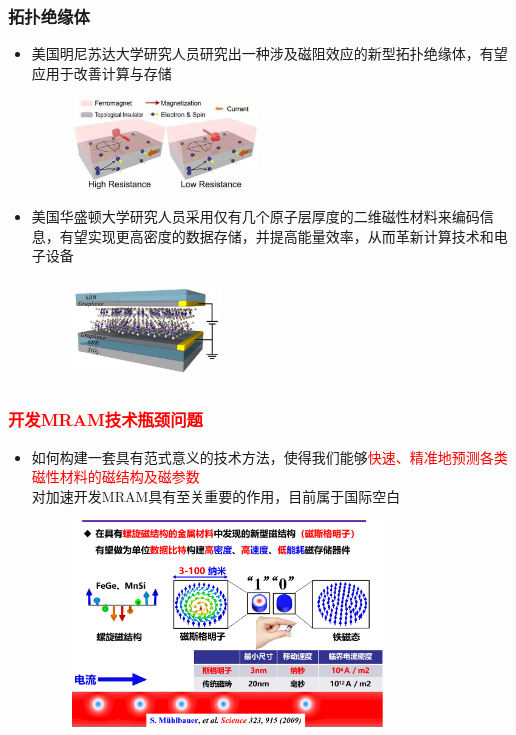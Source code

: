 \documentclass[cjk,slidestop,compress,mathserif,blue]{beamer}
\begin{document}
\frame
{
	\frametitle{拓扑绝缘体}
	\begin{itemize}
		\item {\tiny \textrm{美国明尼苏达大学研究人员研究出一种涉及磁阻效应的新型拓扑绝缘体，有望应用于改善计算与存储}}
\begin{figure}[h!]
\vspace*{-0.04in}
\centering
\includegraphics[height=0.95in,width=1.95in]{Figures/Topological-Insulator.png}
\label{Fig:Topological-Insulator}
\end{figure}
\item {\tiny \textrm{美国华盛顿大学研究人员采用仅有几个原子层厚度的二维磁性材料来编码信息，有望实现更高密度的数据存储，并提高能量效率，从而革新计算技术和电子设备}}
\begin{figure}[h!]
\vspace*{-0.04in}
\centering
\includegraphics[height=1.05in,width=1.55in]{Figures/CrI3-Layer.png}
\label{Fig:CrI3-Layer}
\end{figure}
	\end{itemize}
}

\frame
{
	\frametitle{\textcolor{red}{开发\textrm{MRAM}技术瓶颈问题}}
	\begin{itemize}
		\item 如何构建一套具有范式意义的技术方法，使得我们能够\textcolor{red}{快速、精准地预测各类磁性材料的磁结构及磁参数}\\
			对加速开发\textrm{MRAM}具有至关重要的作用，目前属于国际空白
\begin{figure}[h!]
\vspace*{-0.04in}
\centering
\includegraphics[height=2.15in,width=3.25in]{Figures/Magnet-skyrmion.png}
\label{Fig:Magnet-skyrmion}
\end{figure}
	\end{itemize}
}
\end{document}
